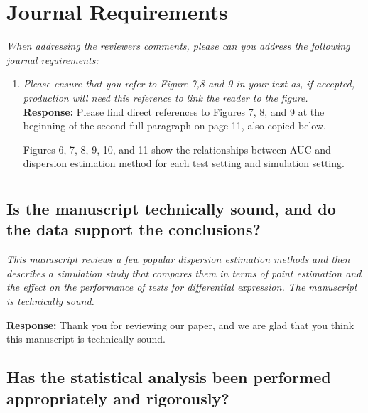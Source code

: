 \documentclass{article}
\providecommand{\q}{$\quad$ \newline}
\begin{document}
\begin{flushleft}
\newpage

\section*{Journal Requirements}

\emph{When addressing the reviewers comments, please can you address the following journal requirements:}
\begin{enumerate}\item \emph{Please ensure that you refer to Figure 7,8 and 9 in your text as, if accepted, production will need this reference to link the reader to the figure.} \q \q
{\bf Response:} Please find direct references to Figures 7, 8, and 9 at the beginning of the second full paragraph on page 11, also copied below. \q

{\color{blue}Figures 6, 7, 8, 9, 10, and 11 show the relationships between AUC and dispersion estimation method for each test setting and simulation setting.}

\end{enumerate}

\section{}

\subsection{Is the manuscript technically sound, and do the data support the conclusions?}

\emph{This manuscript reviews a few popular dispersion estimation methods and then describes a simulation study that compares them in terms of point estimation and the effect on the performance of tests for differential expression. The manuscript is technically sound.} \q

{\bf Response:} Thank you for reviewing our paper, and we are glad that you think this manuscript is technically sound.

\subsection{Has the statistical analysis been performed appropriately and rigorously?}


\end{flushleft}
\end{document}
